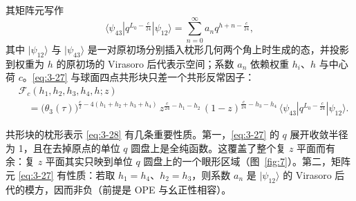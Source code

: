 
其矩阵元写作
\begin{equation}\label{eq:3-27}
  \langle\psi_{43}|q^{L_0-\frac{c}{24}}|\psi_{12}\rangle
  =\sum_{n=0}^{\infty}a_nq^{h+n-\frac{c}{24}},
\end{equation}
其中 $|\psi_{12}\rangle$ 与 $|\psi_{43}\rangle$ 是一对原初场分别插入枕形几何两个角上时生成的态，并投影到权重为 $h$ 的原初场的 Virasoro 后代表示空间；系数 $a_n$ 依赖权重 $h_i$、$h$ 与中心荷 $c$。\eqref{eq:3-27} 与球面四点共形块只差一个共形反常因子：
\begin{equation}\label{eq:3-28}
  \begin{aligned}
  &\mathcal{F}_c(h_1,h_2,h_3,h_4,h;z)\\
  &\quad=\bigl(\theta_3(\tau)\bigr)^{\frac{c}{2}-4(h_1+h_2+h_3+h_4)}
  \,z^{\frac{c}{24}-h_1-h_2}\,(1-z)^{\frac{c}{24}-h_3-h_4}\,
  \langle\psi_{43}|q^{L_0-\frac{c}{24}}|\psi_{12}\rangle .
  \end{aligned}
\end{equation}


共形块的枕形表示 \eqref{eq:3-28} 有几条重要性质。第一，\eqref{eq:3-27} 的 $q$ 展开收敛半径为 1，且在去掉原点的单位 $q$ 圆盘上是全纯函数。这覆盖了整个复 $z$ 平面而有余：复 $z$ 平面其实只映到单位 $q$ 圆盘上的一个眼形区域（图~\ref{fig:7}）。第二，矩阵元 \eqref{eq:3-27} 有性质：若取 $h_1=h_4$、$h_2=h_3$，则系数 $a_n$ 是 $|\psi_{12}\rangle$ 的 Virasoro 后代的模方，因而非负（前提是 OPE 与幺正性相容）。

